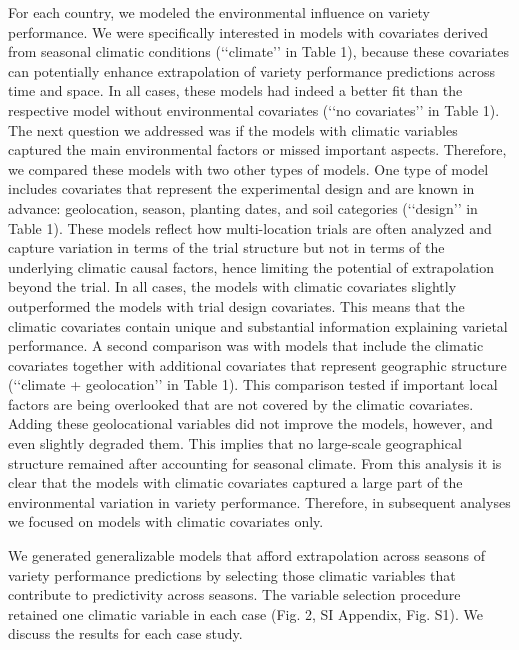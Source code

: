 \documentclass[9pt,twocolumn,twoside]{pnas-new}
\begin{document}
For each country, we modeled the environmental influence on variety performance. We were specifically interested in models with covariates derived from seasonal climatic conditions (‘‘climate’’ in Table 1), because these covariates can potentially enhance extrapolation of variety performance predictions across time and space. In all cases, these models had indeed a better fit than the respective model without environmental covariates (‘‘no covariates’’ in Table 1). The next question we addressed was if the models with climatic variables captured the main environmental factors or missed important aspects. Therefore, we compared these models with two other types of models. One type of model includes covariates that represent the experimental design and are known in advance: geolocation, season, planting dates, and soil categories (‘‘design’’ in Table 1). These models reflect how multi-location trials are often analyzed and capture variation in terms of the trial structure but not in terms of the underlying climatic causal factors, hence limiting the potential of extrapolation beyond the trial. In all cases, the models with climatic covariates slightly outperformed the models with trial design covariates. This means that the climatic covariates contain unique and substantial information explaining varietal performance. A second comparison was with models that include the climatic covariates together with additional covariates that represent geographic structure (‘‘climate + geolocation’’ in Table 1). This comparison tested if important local factors are being overlooked that are not covered by the climatic covariates. Adding these geolocational variables did not improve the models, however, and even slightly degraded them. This implies that no large-scale geographical structure remained after accounting for seasonal climate. From this analysis it is clear that the models with climatic covariates captured a large part of the environmental variation in variety performance. Therefore, in subsequent analyses we focused on models with climatic covariates only.

We generated generalizable models that afford extrapolation across seasons of variety performance predictions by selecting those climatic variables that contribute to predictivity across seasons. The variable selection procedure retained one climatic variable in each case (Fig. 2, SI Appendix, Fig. S1). We discuss the results for each case study. 
\end{document}
